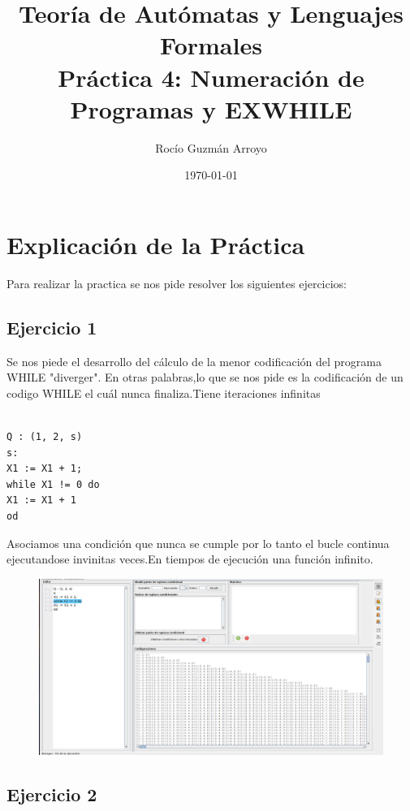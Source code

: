 \documentclass[fleqn, 10pt]{article}
\title{Teoría de Autómatas y Lenguajes Formales\\[.4\baselineskip]Práctica 4: Numeración de Programas y EXWHILE\\}
\author{Rocío Guzmán Arroyo}
\date{\today}
\theoremstyle{plain}
\theoremstyle{definition}
\begin{document}
\maketitle

\section{Explicación de la Práctica}
Para realizar la practica se nos pide resolver los siguientes ejercicios:

\subsection{Ejercicio 1}

Se nos piede el desarrollo del cálculo de la menor codificación del programa WHILE "diverger".
En otras palabras,lo que se nos pide es la codificación de un codigo WHILE el cuál nunca finaliza.Tiene iteraciones infinitas

\begin{verbatim}

Q : (1, 2, s)
s: 	
X1 := X1 + 1;
while X1 != 0 do
X1 := X1 + 1	
od

\end{verbatim}

Asociamos una condición que nunca se cumple por lo tanto el bucle continua ejecutandose invinitas veces.En tiempos de ejecución una función infinito.

\begin{figure}[h]
\begin{center}
\includegraphics[width=16cm]{Diverger}
\end{center}
\end{figure}

\newpage

\subsection{Ejercicio 2}
\end{document}
